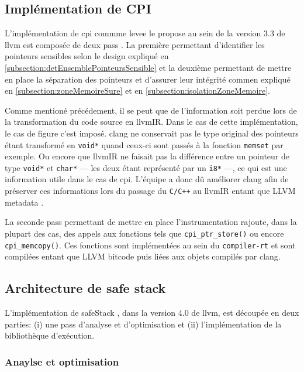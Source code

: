 \subsection{Implémentation de CPI}

L'implémentation de \gls{cpi} commme \gls{levee} le propose au sein de la version 3.3 de \gls{llvm} est composée de deux \og pass \fg. La première permettant d'identifier les pointeurs sensibles selon le design expliqué en \autoref{subsection:detEnsemblePointeursSensible} et la deuxième permettant de mettre en place la séparation des pointeurs et d'assurer leur intégrité commen expliqué en \autoref{subsection:zoneMemoireSure} et en \autoref{subsection:isolationZoneMemoire}.

Comme mentioné précédement, il se peut que de l'information soit perdue lors de la transformation du code source en \gls{llvmIR}. Dans le cas de cette implémentation, le cas de figure c'est imposé. \gls{clang} ne conservait pas le type original des pointeurs étant transformé en \texttt{void*} quand ceux-ci sont passés à la fonction \texttt{memset} par exemple. Ou encore que \gls{llvmIR} ne faisait pas la différence entre un pointeur de type \texttt{void*} et \texttt{char*} --- les deux étant représenté par un \texttt{i8*} ---, ce qui est une information utile dans le cas de \gls{cpi}. L'équipe a donc dû améliorer \gls{clang} afin de préserver ces informations lors du passage du \texttt{C/C++} au \gls{llvmIR} entant que \og LLVM metadata \fg.

La seconde \og pass \fg permettant de mettre en place l'instrumentation rajoute, dans la plupart des cas, des appels aux fonctions tels que \texttt{cpi_ptr_store()} ou encore \texttt{cpi_memcopy()}. Ces fonctions sont implémentées au sein du \og \texttt{compiler-rt} \fg et sont compilées entant que \og LLVM bitcode \fg puis liées aux objets compilés par \gls{clang}.

\subsection{Architecture de \og safe stack \fg}
\label{subsection:architectureSafeStack}

L'implémentation de \og \gls{safeStack} \fg, dans la version 4.0 de \gls{llvm}, est découpée en deux parties: (i) une \og pass \fg d'analyse et d'optimisation et (ii) l'implémentation de la bibliothèque d'exécution.

\subsubsection{Anaylse et optimisation}


